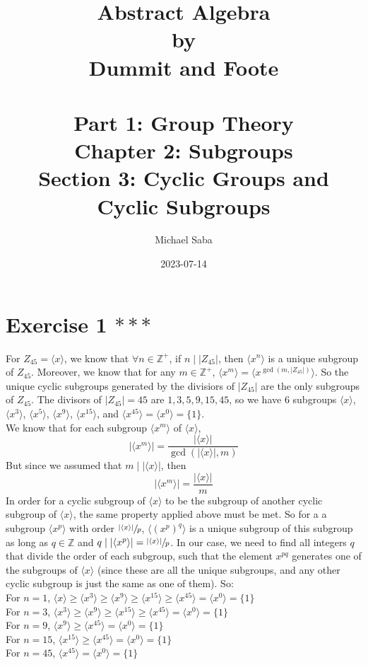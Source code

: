 \documentclass{article}
\title{%
    \Huge Abstract Algebra \\
    \large by \\
    \Large Dummit and Foote \\~\\
    \huge Part 1: Group Theory \\
    \LARGE Chapter 2: Subgroups \\
    \Large Section 3: Cyclic Groups and Cyclic Subgroups
}
\date{2023-07-14}
\author{Michael Saba}
\newcommand{\Z}{\mathbb{Z}}
\begin{document}
    \maketitle
    \newpage


    \section*{Exercise 1 $***$}
    For $Z_{45} = \langle x \rangle$,
    we know that $\forall n \in \Z^+$,
    if $n \mid |Z_{45}|$,
    then $\langle x^n \rangle$ is a unique subgroup of $Z_{45}$.
    Moreover, we know that for any $m \in \Z^+$,
    $\langle x^m \rangle = \langle x^{\gcd(m, |Z_{45}|)} \rangle$.
    So the unique cyclic subgroups generated by the divisiors of $|Z_45|$
    are the only subgroups of $Z_{45}$.
    The divisors of $|Z_{45}| = 45$ are $1, 3, 5, 9, 15, 45$,
    so we have 6 subgroups $\langle x \rangle$, 
    $\langle x^3 \rangle$, $\langle x^5 \rangle$,
    $\langle x^9 \rangle$, $\langle x^{15} \rangle$,
    and $\langle x^{45} \rangle = \langle x^0 \rangle = \{1\}$. \\
    We know that for each subgroup
    $\langle x^m \rangle$ of $\langle x \rangle$,
    \[ |\langle x^m \rangle|
    = \dfrac{|\langle x \rangle|}{\gcd(|\langle x \rangle|, m)} \]
    But since we assumed that $m \mid |\langle x \rangle|$,
    then 
    \[ |\langle x^m \rangle|
    = \dfrac{|\langle x \rangle|}{m} \]
    In order for a cyclic subgroup of $\langle x \rangle$
    to be the subgroup of another cyclic subgroup of $\langle x \rangle$,
    the same property applied above must be met.
    So for a a subgroup $\langle x^p \rangle$ with order 
    $\sfrac{|\langle x \rangle|}{p}$,
    $\langle (x^p)^q \rangle$ is a unique subgroup of this subgroup
    as long as $q \in \Z$ and $q \mid |\langle x^p \rangle|
    = \sfrac{|\langle x \rangle|}{p}$.
    In our case, we need to find all integers $q$
    that divide the order of each subgroup,
    such that the element $x^{pq}$ generates one of the subgroups
    of $\langle x \rangle$
    (since these are all the unique subgroups, and any other cyclic
    subgroup is just the same as one of them).
    So: \\
    For $n = 1$, $\langle x \rangle
    \geqslant \langle x^3 \rangle 
    \geqslant \langle x^9 \rangle
    \geqslant \langle x^{15} \rangle
    \geqslant \langle x^{45} \rangle = \langle x^0 \rangle = \{1\}$ \\
    For $n = 3$, $\langle x^3 \rangle 
    \geqslant \langle x^9 \rangle
    \geqslant \langle x^{15} \rangle
    \geqslant \langle x^{45} \rangle = \langle x^0 \rangle = \{1\}$ \\
    For $n = 9$, $\langle x^9 \rangle
    \geqslant \langle x^{45} \rangle = \langle x^0 \rangle = \{1\}$ \\
    For $n = 15$, $\langle x^{15} \rangle
    \geqslant \langle x^{45} \rangle = \langle x^0 \rangle = \{1\}$ \\
    For $n = 45$, $\langle x^{45} \rangle = \langle x^0 \rangle = \{1\}$ \\
\end{document}
